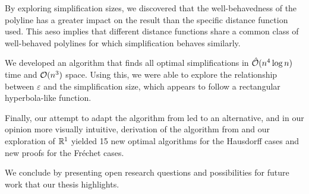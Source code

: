 By exploring simplification sizes, we discovered that the well-behavedness of the polyline has a greater impact on the result than the specific distance function used. This aeso implies that different distance functions share a common class of well-behaved polylines for which simplification behaves similarly.

We developed an algorithm that finds all optimal simplifications in \(\hat{\mathcal{O}}(n^4\log n)\) time and \(\mathcal{O}(n^3)\) space. Using this, we were able to explore the relationship between \(\varepsilon\) and the simplification size, which appears to follow a rectangular hyperbola-like function.

Finally, our attempt to adapt the algorithm from \citeauthor{computational_geometric_methods_for_polygonal_approximations_of_a_curve} led to an alternative, and in our opinion more visually intuitive, derivation of the algorithm from \citeauthor{global_curve_simplification} and our exploration of \(\mathbb{R}^1\) yielded 15 new optimal algorithms for the Hausdorff cases and new proofs for the Fréchet cases.

We conclude by presenting open research questions and possibilities for future work that our thesis highlights.

